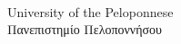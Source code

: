 
\vspace*{-3cm}~\\
{\huge University of the Peloponnese}\\
{\huge Πανεπιστημίο Πελοποννήσου}
\vspace*{6ex}